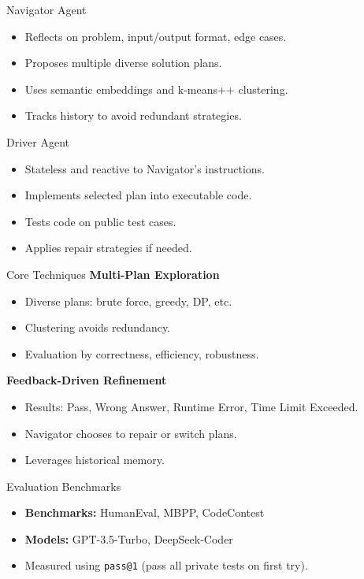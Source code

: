 \documentclass{beamer}
\begin{document}
\begin{frame}{Navigator Agent}
\begin{itemize}
    \item Reflects on problem, input/output format, edge cases.
    \item Proposes multiple diverse solution plans.
    \item Uses semantic embeddings and k-means++ clustering.
    \item Tracks history to avoid redundant strategies.
\end{itemize}
\end{frame}

\begin{frame}{Driver Agent}
\begin{itemize}
    \item Stateless and reactive to Navigator's instructions.
    \item Implements selected plan into executable code.
    \item Tests code on public test cases.
    \item Applies repair strategies if needed.
\end{itemize}
\end{frame}

\begin{frame}{Core Techniques}
\textbf{Multi-Plan Exploration}
\begin{itemize}
    \item Diverse plans: brute force, greedy, DP, etc.
    \item Clustering avoids redundancy.
    \item Evaluation by correctness, efficiency, robustness.
\end{itemize}
\textbf{Feedback-Driven Refinement}
\begin{itemize}
    \item Results: Pass, Wrong Answer, Runtime Error, Time Limit Exceeded.
    \item Navigator chooses to repair or switch plans.
    \item Leverages historical memory.
\end{itemize}
\end{frame}

\begin{frame}{Evaluation Benchmarks}
\begin{itemize}
    \item \textbf{Benchmarks:} HumanEval, MBPP, CodeContest
    \item \textbf{Models:} GPT-3.5-Turbo, DeepSeek-Coder
    \item Measured using \texttt{pass@1} (pass all private tests on first try).
\end{itemize}
\end{frame}
\end{document}
